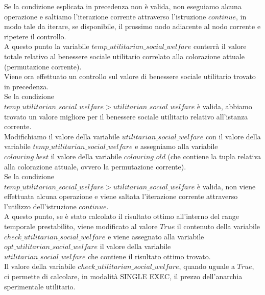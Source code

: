 Se la condizione esplicata in precedenza non è valida, non eseguiamo alcuna operazione e saltiamo l'iterazione corrente attraverso l'istruzione $continue$, in modo tale da iterare, se disponibile, il prossimo nodo adiacente al nodo corrente e ripetere il controllo.\\

A questo punto la variabile $temp\_utilitarian\_social\_welfare$ conterrà il valore totale relativo al benessere sociale utilitario correlato alla colorazione attuale (permutazione corrente).\\

Viene ora effettuato un controllo sul valore di benessere sociale utilitario trovato in precedenza.\\
Se la condizione \\
$temp\_utilitarian\_social\_welfare > utilitarian\_social\_welfare$ è valida, abbiamo trovato un valore migliore per il benessere sociale utilitario relativo all'istanza corrente.\\

Modifichiamo il valore della variabile $utilitarian\_social\_welfare$ con il valore della variabile $temp\_utilitarian\_social\_welfare$ e assegniamo alla variabile $colouring\_best$ il valore della variabile $colouring\_old$ (che contiene la tupla relativa alla colorazione attuale, ovvero la permutazione corrente).\\

Se la condizione \\
$temp\_utilitarian\_social\_welfare > utilitarian\_social\_welfare$ è valida, non viene effettuata alcuna operazione e viene saltata l'iterazione corrente attraverso l'utilizzo dell'istruzione $continue$.\\

A questo punto, se è stato calcolato il risultato ottimo all'interno del range temporale prestabilito, viene modificato al valore $True$ il contenuto della variabile $check\_utilitarian\_social\_welfare$ e viene assegnato alla variabile $opt\_utilitarian\_social\_welfare$ il valore della variabile \\
$utilitarian\_social\_welfare$ che contiene il risultato ottimo trovato.\\

Il valore della variabile $check\_utilitarian\_social\_welfare$, quando uguale a $True$, ci permette di calcolare, in modalità SINGLE EXEC, il prezzo dell'anarchia sperimentale utilitario.\\

